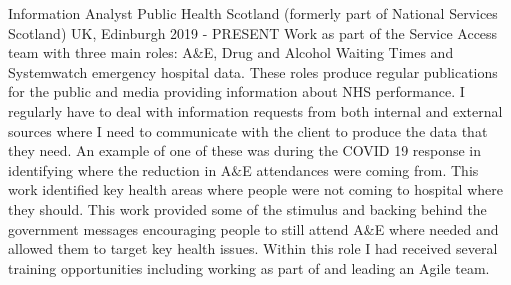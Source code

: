 \begin{cventries}

\end{cventries}





\begin{cventries}

    
 \cventry
    {Information Analyst} %
    {Public Health Scotland (formerly part of National Services Scotland)} %
    {UK, Edinburgh} %
    {2019 - PRESENT} %
    {
    Work as part of the Service Access team with three main roles: A$\&$E, Drug and Alcohol Waiting Times and Systemwatch emergency hospital data. These roles produce regular publications for the public and media providing information about NHS performance. I regularly have to deal with information requests from both internal and external sources where I need to communicate with the client to produce the data that they need. An example of one of these was during the COVID 19 response in identifying where the reduction in A$\&$E attendances were coming from. This work identified key health areas where people were not coming to hospital where they should. This work provided some of the stimulus and backing behind the government messages encouraging people to still attend A$\&$E where needed and allowed them to target key health issues.\newline
    Within this role I had received several training opportunities including working as part of and leading an Agile team.
    }
    


\end{cventries}
